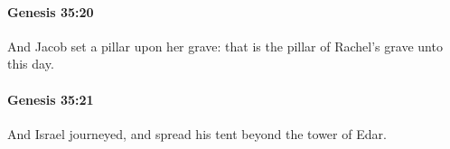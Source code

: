 		\paragraph{Genesis 35:20} %
			\label{GENESIS-35-20}

			And Jacob set a pillar upon her grave: that is the pillar of Rachel's grave unto this day.


		\paragraph{Genesis 35:21} %
			\label{GENESIS-35-21}

			And Israel journeyed, and spread his tent beyond the tower of Edar.


